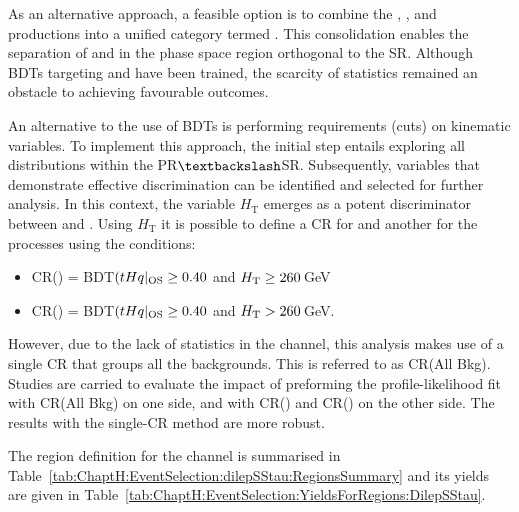 As an alternative approach, a feasible option is to combine the \ttW, \ttZ, and \ttH productions into a 
unified category termed \ttX. This consolidation enables the separation of \ttbar and \ttX in the phase 
space region orthogonal to the SR. Although BDTs targeting \ttbar and \ttX have been trained, the 
scarcity of statistics remained an obstacle to achieving favourable outcomes. 

An alternative to the use of BDTs is performing requirements (cuts) on kinematic variables. 
To implement this approach, the initial step entails exploring all \dilepSStau distributions within 
the PR$\textbackslash $SR. Subsequently, variables that demonstrate effective \ttbar discrimination 
can be identified and selected for further analysis. In this context, the variable $H_{\text{T}}$ emerges as a potent 
discriminator between \ttbar and \ttX. %
Using $H_{\text{T}}$ it is possible to define a CR for \ttbar and another for the \ttX processes using the 
conditions:
\begin{itemize}
	\item CR(\ttbar) =  BDT$(tHq|_{\text{OS}}\geq 0.40$ and $H_{\text{T}} \geq 260\,$GeV
	\item CR(\Zjets) = BDT$(tHq|_{\text{OS}}\geq 0.40$ and $H_{\text{T}} > 260\,$GeV.
\end{itemize}
However, due to the lack of statistics in the \dilepSStau channel, this analysis makes use
of a single CR that groups all the backgrounds. This is referred to as CR(All Bkg).
Studies are carried to evaluate the impact of preforming the profile-likelihood fit with  
CR(All Bkg) on one side, and with CR(\ttbar) and CR(\Zjets) on the other side. 
The results with the single-CR method are more robust.

The region definition for the \dilepSStau channel is summarised 
in Table~\ref{tab:ChaptH:EventSelection:dilepSStau:RegionsSummary}
and its yields are given in Table~\ref{tab:ChaptH:EventSelection:YieldsForRegions:DilepSStau}.
 



